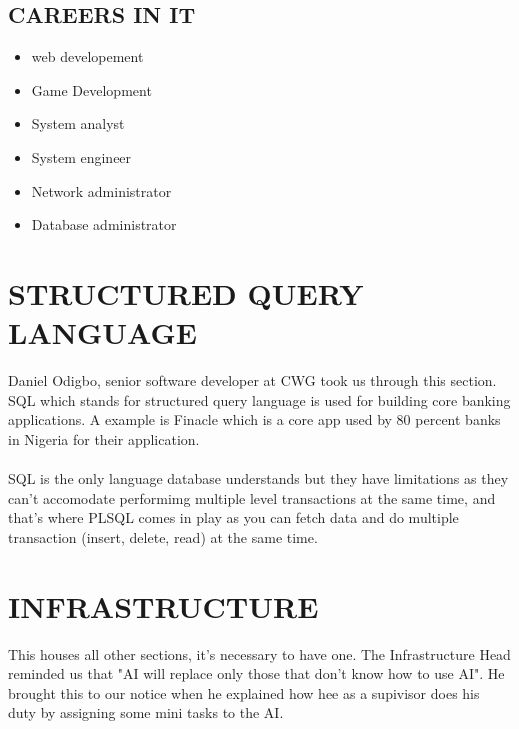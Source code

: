 \documentclass[a4paper,12pt]{report}
\begin{document}
\subsection[IT careers]{CAREERS IN IT}
\begin{itemize}
    \item web developement
    \item Game Development
    \item System analyst
    \item System engineer
    \item Network administrator
    \item Database administrator
\end{itemize}

\section[SQL]{STRUCTURED QUERY LANGUAGE}
Daniel Odigbo, senior software developer at CWG took us through this section. SQL which stands for structured query language is used for building core banking applications. A example is Finacle which is a core app used by 80 percent banks in Nigeria for their application.
\paragraph{}
SQL is the only language database understands but they have limitations as they can't accomodate performimg multiple level transactions at the same time, and that's where PLSQL comes in play as you can fetch data and do multiple transaction (insert, delete, read) at the same time.

\section[Infrastructure]{INFRASTRUCTURE}
This houses all other sections, it's necessary to have one. The Infrastructure Head reminded us that "AI will replace only those that don't know how to use AI". He brought this to our notice when he explained how hee as a supivisor does his duty by assigning some mini tasks to the AI. 
\end{document}
